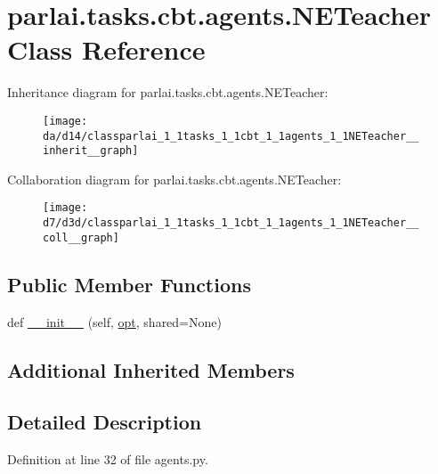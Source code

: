 \hypertarget{classparlai_1_1tasks_1_1cbt_1_1agents_1_1NETeacher}{}\section{parlai.\+tasks.\+cbt.\+agents.\+N\+E\+Teacher Class Reference}
\label{classparlai_1_1tasks_1_1cbt_1_1agents_1_1NETeacher}


Inheritance diagram for parlai.\+tasks.\+cbt.\+agents.\+N\+E\+Teacher\+:\nopagebreak
\begin{figure}[H]
\begin{center}
\leavevmode
\texttt{[image: da/d14/classparlai\_1\_1tasks\_1\_1cbt\_1\_1agents\_1\_1NETeacher\_\_inherit\_\_graph]}
\end{center}
\end{figure}


Collaboration diagram for parlai.\+tasks.\+cbt.\+agents.\+N\+E\+Teacher\+:\nopagebreak
\begin{figure}[H]
\begin{center}
\leavevmode
\texttt{[image: d7/d3d/classparlai\_1\_1tasks\_1\_1cbt\_1\_1agents\_1\_1NETeacher\_\_coll\_\_graph]}
\end{center}
\end{figure}
\subsection*{Public Member Functions}
\begin{DoxyCompactItemize}
\item 
def \hyperlink{classparlai_1_1tasks_1_1cbt_1_1agents_1_1NETeacher_aee59236dace0e90a86ce8ca23b8e05d2}{\+\_\+\+\_\+init\+\_\+\+\_\+} (self, \hyperlink{classparlai_1_1core_1_1teachers_1_1FbDialogTeacher_af7a9ec497b9cd0292d7b8fa220da7c28}{opt}, shared=None)
\end{DoxyCompactItemize}
\subsection*{Additional Inherited Members}


\subsection{Detailed Description}


Definition at line 32 of file agents.\+py.



